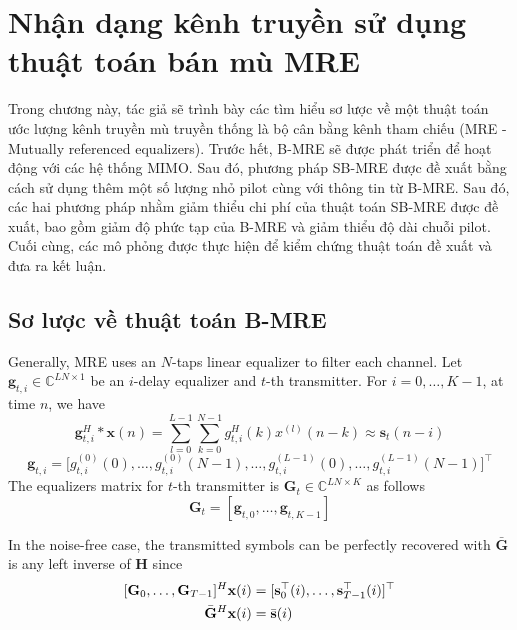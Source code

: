\clearpage
{}

\setcounter{chapter}{1}
\chapter[{NHẬN DẠNG KÊNH TRUYỀN SỬ DỤNG THUẬT TOÁN BÁN MÙ MRE}]{Nhận dạng kênh truyền sử dụng thuật toán bán mù MRE}
\label{sec:MRE}

Trong chương này, tác giả sẽ trình bày các tìm hiểu sơ lược về một thuật toán ước lượng kênh truyền mù truyền thống là bộ cân bằng kênh tham chiếu (MRE - Mutually referenced equalizers). Trước hết, B-MRE sẽ được phát triển để hoạt động với các hệ thống MIMO. Sau đó, phương pháp SB-MRE được đề xuất bằng cách sử dụng thêm một số lượng nhỏ pilot cùng với thông tin từ B-MRE. Sau đó, các hai phương pháp nhằm giảm thiểu chi phí của thuật toán SB-MRE được đề xuất, bao gồm giảm độ phức tạp của B-MRE và giảm thiểu độ dài chuỗi pilot. Cuối cùng, các mô phỏng được thực hiện để kiểm chứng thuật toán đề xuất và đưa ra kết luận.

\section{Sơ lược về thuật toán B-MRE}

Generally, MRE uses an $N$-taps linear equalizer to filter each channel. Let $\mathbf{g}_{t, i}  \in \mathbb{C}^{LN \times 1}$ be an $i$-delay equalizer and $t$-th transmitter. For \mbox{$i=0, \ldots, K-1$}, at time $n$, we have
\begin{equation}
    \mathbf{g}^H_{t, i} * \mathbf{x}(n)=\sum_{l=0}^{L-1}\sum_{k=0}^{N-1} g^H_{t,i}(k) x^{(l)}(n-k) \approx \mathbf{s}_t(n-i)
\end{equation}
\begin{equation}
    \mathbf{g}_{t,i}=\big[g_{t, i}^{(0)}(0), \ldots, g_{t, i}^{(0)}(N - 1), \ldots,
    g_{t, i}^{(L-1)}(0), \ldots, g_{t, i}^{(L-1)} (N-1) \big]^\top
\end{equation}
The equalizers matrix for $t$-th transmitter is $\mathbf{G}_t \in \mathbb{C}^{LN \times K}$ as follows
\begin{equation}
    \mathbf{G}_t = [\mathbf{g}_{t, 0}, \ldots, \mathbf{g}_{t, K-1}]
\end{equation}

In the noise-free case, the transmitted symbols can be perfectly recovered with $\bar{\mathbf{G}}$ is any left inverse of $\mathbf{H}$ since
\begin{equation}
    \begin{aligned}
        \relax[\mathbf{G}_0, \ldots, \mathbf{G}_{T-1}]^{H} 
        \mathbf{x}(i)
        &= [\mathbf{s}_0^\top(i), \ldots, \mathbf{s}^\top_{T-1}(i)]^\top \\
        \bar{\mathbf{G}}^H \mathbf{x}(i) &= \bar{\mathbf{s}}(i)
    \end{aligned}   
\end{equation}


